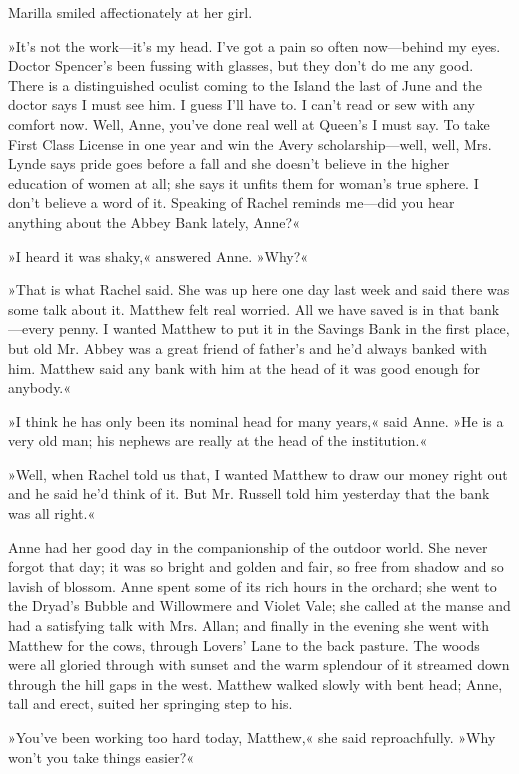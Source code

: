 Marilla smiled affectionately at her girl.

»It's not the work—it's my head. I've got a pain so often now—behind my eyes. Doctor Spencer's been fussing with glasses, but they don't do me any good. There is a distinguished oculist coming to the Island the last of June and the doctor says I must see him. I guess I'll have to. I can't read or sew with any comfort now. Well, Anne, you've done real well at Queen's I must say. To take First Class License in one year and win the Avery scholarship—well, well, Mrs. Lynde says pride goes before a fall and she doesn't believe in the higher education of women at all; she says it unfits them for woman's true sphere. I don't believe a word of it. Speaking of Rachel reminds me—did you hear anything about the Abbey Bank lately, Anne?«

»I heard it was shaky,« answered Anne. »Why?«

»That is what Rachel said. She was up here one day last week and said there was some talk about it. Matthew felt real worried. All we have saved is in that bank—every penny. I wanted Matthew to put it in the Savings Bank in the first place, but old Mr. Abbey was a great friend of father's and he'd always banked with him. Matthew said any bank with him at the head of it was good enough for anybody.«

»I think he has only been its nominal head for many years,« said Anne. »He is a very old man; his nephews are really at the head of the institution.«

»Well, when Rachel told us that, I wanted Matthew to draw our money right out and he said he'd think of it. But Mr. Russell told him yesterday that the bank was all right.«

Anne had her good day in the companionship of the outdoor world. She never forgot that day; it was so bright and golden and fair, so free from shadow and so lavish of blossom. Anne spent some of its rich hours in the orchard; she went to the Dryad's Bubble and Willowmere and Violet Vale; she called at the manse and had a satisfying talk with Mrs. Allan; and finally in the evening she went with Matthew for the cows, through Lovers' Lane to the back pasture. The woods were all gloried through with sunset and the warm splendour of it streamed down through the hill gaps in the west. Matthew walked slowly with bent head; Anne, tall and erect, suited her springing step to his.

»You've been working too hard today, Matthew,« she said reproachfully. »Why won't you take things easier?«


